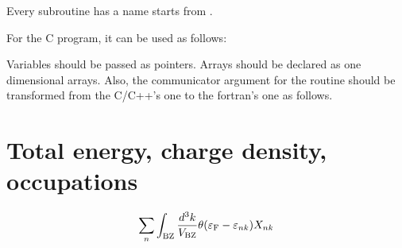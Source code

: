 \documentclass[letterpaper,10pt,pdftex,openany,english]{sphinxmanual}
\begin{document}
\sphinxAtStartPar
Every subroutine has a name starts from .

\sphinxAtStartPar
For the C program, it can be used as follows:

\begin{sphinxVerbatim}[commandchars=\\\{\}]

\end{sphinxVerbatim}

\sphinxAtStartPar
Variables should be passed as pointers.
Arrays should be declared as one dimensional arrays.
Also, the communicator argument for the routine should be
transformed from the C/C++’s one to the fortran’s one as follows.

\begin{sphinxVerbatim}[commandchars=\\\{\}]
\end{sphinxVerbatim}


\section{Total energy, charge density, occupations}
\label{\detokenize{routine:total-energy-charge-density-occupations}}\begin{equation*}
\begin{split}\begin{align}
\sum_{n}
\int_{\rm BZ} \frac{d^3 k}{V_{\rm BZ}}
\theta(\varepsilon_{\rm F} -
\varepsilon_{n k}) X_{n k}
\end{align}\end{split}
\end{equation*}
\begin{sphinxVerbatim}[commandchars=\\\{\}]
\end{sphinxVerbatim}
\end{document}
